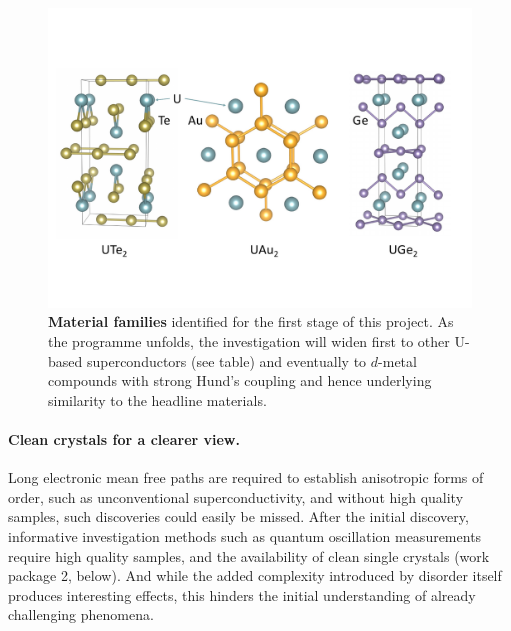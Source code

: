 


\begin{figure}[t]
\centerline{\includegraphics[width=\columnwidth]{Figures/Structures.pdf}}

   \caption{{\bf Material families} identified for the first stage of this project. As the programme unfolds, the investigation will widen first to other U-based superconductors (see table) and eventually to $d$-metal compounds with strong Hund's coupling and hence underlying similarity to the headline materials. }
   
    \label{fig:Materials}
\end{figure}

\paragraph{Clean crystals for a clearer view.} Long electronic mean free paths are required to establish anisotropic forms of order, such as unconventional superconductivity, and without high quality samples, such discoveries could easily be missed. After the initial discovery, informative investigation methods such as quantum oscillation measurements require high quality samples, and the availability of clean single crystals  (work package 2, below). And while the added complexity introduced by disorder itself produces interesting effects, this hinders the initial understanding of already challenging phenomena. %



